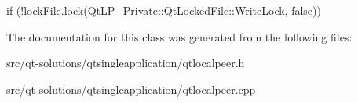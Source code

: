 if (!lockFile.lock(QtLP\_\-Private::QtLockedFile::WriteLock, false)) 



The documentation for this class was generated from the following files:\begin{DoxyCompactItemize}
\item 
src/qt-\/solutions/qtsingleapplication/qtlocalpeer.h\item 
src/qt-\/solutions/qtsingleapplication/qtlocalpeer.cpp\end{DoxyCompactItemize}
